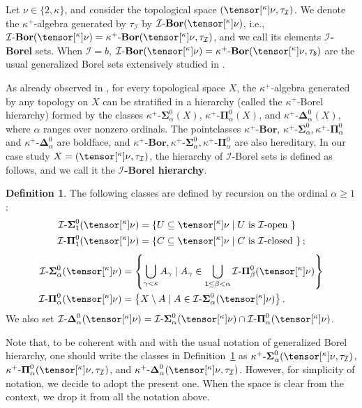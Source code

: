 \documentclass{amsart}
\numberwithin{equation}{section}
\newcommand{\I}{\mathcal{I}}
\newcommand{\pre}[2]{\tensor[^{#1}]{#2}{}}
\newcommand{\markdef}[1]{\textbf{#1}}
\newcommand{\1}{\mathbf{I}}
\newcommand{\2}{\mathbf{II}}
\newcommand{\Bor}{\k^+\text{-}\mathbf{Bor}}
\newcommand{\Sii}[2]{\k^+\text{-}\boldsymbol{\Sigma}^{ #1 }_{ #2}}
\newcommand{\Pii}[2]{\k^+\text{-}\boldsymbol{\Pi}^{ #1 }_{ #2 }}
\newcommand{\Dee}[2]{\k^+\text{-}\boldsymbol{\Delta}^{ #1 }_{ #2}}
\newcommand{\Borid}{\I\text{-}\mathbf{Bor}}
\newcommand{\Siid}[2]{\I\text{-}\boldsymbol{\Sigma}^{ #1 }_{ #2}}
\newcommand{\Piid}[2]{\I\text{-}\boldsymbol{\Pi}^{ #1 }_{ #2 }}
\newcommand{\Deid}[2]{\I\text{-}\boldsymbol{\Delta}^{ #1 }_{ #2}}
\renewcommand{\a}{\alpha}
\renewcommand{\b}{\beta}
\renewcommand{\k}{\kappa}
\theoremstyle{definition}
\newtheorem{definition}[theorem]{Definition}
\theoremstyle{remark}
\begin{document}
Let \( \nu  \in \{ 2,\k\}\), and consider the topological space \((\pre{\k}{\nu} , \tau_\I) \). We denote the $\k^+$-algebra generated by \(\tau_\I\) by \( \Borid(\pre{\k}{\nu} )\), i.e., \(\Borid(\pre{\k}{\nu} )= \Bor(\pre{\k}{\nu} , \tau_\I)\), and we call its elements \markdef{\( \I \)-Borel} sets. \label{def:Iborel}
When \(\I=b\), \( \Borid(\pre{\k}{\nu} )=\Bor(\pre{\k}{\nu}, \tau_b)\) are the usual generalized Borel sets extensively studied in \cite{MV, FHK14, ACMRP}. 


As already observed in \cite{ACMRP}, for every topological space \(X\), the \(\k^+\)-algebra generated by any topology on \(X\) can be stratified in a hierarchy (called the \(\k^+\)-Borel hierarchy) formed by the classes \(\Sii{0}{\a}(X) \), \(\Pii{0}{\a}(X) \), and \( \Dee{0}{\a}(X)  \), where \(\a\) ranges over nonzero ordinals. The pointclasses \(\Bor\), \(\Sii{0}{\a}, \Pii{0}{\a}\) and \(\Dee{0}{\a}\) are boldface, and \(\Bor, \Sii{0}{\a}, \Pii{0}{\a}\) are also hereditary.
In our case study \(X=(\pre{\k}{\nu},\tau_\I)\), the hierarchy of $\I$-Borel sets is defined as follows, and we call it the \markdef{$\I$-Borel hierarchy}.  
 
\begin{definition}\label{def_hierarchy}
The following classes are defined by recursion on the ordinal \(\a\geq 1\):
\begin{align*}
\Siid{0}{1}(\pre{\k}{\nu}) &= \left\lbrace  U \subseteq \pre{\k}{\nu} \mid U \text{ is $\I$-open } \right\rbrace  \\
\Piid{0}{1}(\pre{\k}{\nu})&= \left\lbrace  C \subseteq \pre{\k}{\nu} \mid C \text{ is $\I$-closed } \right\rbrace;  
\end{align*}
\begin{align*}
\Siid{0}{\a}(\pre{\k}{\nu})  &=  \left\lbrace \bigcup_{\gamma < \k} A_\gamma \mid  A_\gamma \in \bigcup_{1 \leq \beta < \alpha}  \Piid{0}{\b}(\pre{\k}{\nu}) \right\rbrace  \\
\Piid{0}{\a}(\pre{\k}{\nu}) &= \left\{ X \setminus A  \mid A \in  \Siid{0}{\a}(\pre{\k}{\nu})\right\}.
\end{align*}
We also set \(  \Deid {0}{\a}(\pre{\k}{\nu}) = \Siid{0}{\a}(\pre{\k}{\nu})  \cap \Piid{0}{\a} (\pre{\k}{\nu}) \).
\end{definition}
 Note that, to be coherent with \cite{ACMRP} and with the usual notation of generalized Borel hierarchy, one should write the classes in Definition~\ref{def_hierarchy} as \(\Sii{0}{\a}(\pre{\k}{\nu}, \tau_\I) \), \(\Pii{0}{\a}(\pre{\k}{\nu}, \tau_\I) \), and \( \Dee{0}{\a}(\pre{\k}{\nu}, \tau_\I)  \). However, for simplicity of notation, we decide to adopt the present one.
 When the space is clear from the context, we drop it from all the notation above.
\end{document}

